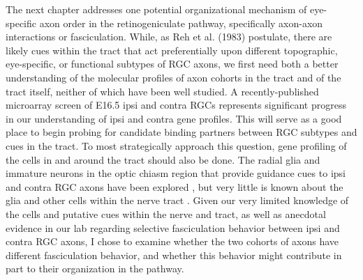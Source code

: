 The next chapter addresses one potential organizational mechanism of eye-specific axon order in the retinogeniculate pathway, specifically axon-axon interactions or fasciculation.
While, as Reh et al. (1983) postulate, there are likely cues within the tract that act preferentially upon different topographic, eye-specific, or functional subtypes of RGC axons, we first need both a better understanding of the molecular profiles of axon cohorts in the tract and of the tract itself, neither of which have been well studied.
A recently-published microarray screen of E16.5 ipsi and contra RGCs represents significant progress in our understanding of ipsi and contra gene profiles.  %
This will serve as a good place to begin probing for candidate binding partners between RGC subtypes and cues in the tract.
To most strategically approach this question, gene profiling of the cells in and around the tract should also be done.
The radial glia and immature neurons in the optic chiasm region that provide guidance cues to ipsi and contra RGC axons have been explored \cite[reviewed in][]{erskine2014connecting,herrera2008genetics,petros2008retinal}, but very little is known about the glia and other cells within the nerve tract \cite{colello1992observations,guillery1987changing}.
Given our very limited knowledge of the cells and putative cues within the nerve and tract, as well as anecdotal evidence in our lab regarding selective fasciculation behavior between ipsi and contra RGC axons, I chose to examine whether the two cohorts of axons have different fasciculation behavior, and whether this behavior might contribute in part to their organization in the pathway.